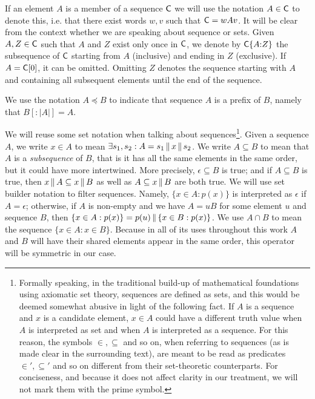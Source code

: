 If an element $A$ is a member of a sequence $\mathsf{C}$ we will use the notation $A
\in \mathsf{C}$ to denote this, i.e. that there exist words $w, v$ such that $\mathsf{C}
= wAv$. It will be clear from the context whether we are speaking about sequence
or sets. Given $A, Z \in \mathsf{C}$ such that $A$ and $Z$ exist only once in
$\mathsf{C}$, we denote by $\mathsf{C}\{A{:}Z\}$ the subsequence of $\mathsf{C}$ starting from
$A$ (inclusive) and ending in $Z$ (exclusive). If $A = \mathsf{C}[0]$, it can be
omitted. Omitting $Z$ denotes the sequence starting with $A$ and containing all
subsequent elements until the end of the sequence.

We use the notation $A \preceq B$ to indicate that sequence $A$ is a prefix of
$B$, namely that $B[{:}|A|] = A$.

We will reuse some set notation when talking about sequences\footnote{Formally
speaking, in the traditional build-up of mathematical foundations using
axiomatic set theory, sequences are defined as sets, and this would be deemed
somewhat abusive in light of the following fact. If $A$ is a sequence and $x$ is
a candidate element, $x \in A$ could have a different truth value when $A$ is
interpreted as set and when $A$ is interpreted as a sequence. For this reason,
the symbols $\in, \subseteq$ and so on, when referring to sequences (as is made
clear in the surrounding text), are meant to be read as predicates $\in',
\subseteq'$ and so on different from their set-theoretic counterparts. For
conciseness, and because it does not affect clarity in our treatment, we will
not mark them with the prime symbol.}. Given a sequence $A$, we write $x \in A$
to mean $\exists s_1, s_2: A = s_1 \,\|\, x \,\|\, s_2$. We write
$A \subseteq B$ to mean that $A$ is a \emph{subsequence} of $B$, that is it has
all the same elements in the same order, but it could have more intertwined.
More precisely, $\epsilon \subseteq B$ is true; and if $A \subseteq B$ is true,
then $x \,\|\, A \subseteq x \,\|\, B$ as well as $A \subseteq x \,\|\, B$
are both true. We will use set builder notation to filter sequences. Namely,
$\{x \in A: p(x)\}$ is interpreted as $\epsilon$ if $A = \epsilon$; otherwise,
if $A$ is non-empty and we have $A = uB$ for some element $u$ and sequence $B$,
then $\{x \in A: p(x)\} = p(u) \,\|\, \{x \in B: p(x)\}$. We use $A \cap B$ to
mean the sequence $\{x \in A: x \in B\}$. Because in all of its uses throughout
this work $A$ and $B$ will have their shared elements appear in the same order,
this operator will be symmetric in our case.

